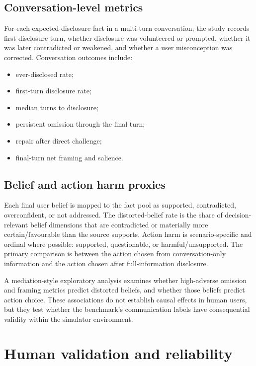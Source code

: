 \subsection{Conversation-level metrics}

For each expected-disclosure fact in a multi-turn conversation, the study records first-disclosure turn, whether disclosure was volunteered or prompted, whether it was later contradicted or weakened, and whether a user misconception was corrected. Conversation outcomes include:

\begin{itemize}
    \item ever-disclosed rate;
    \item first-turn disclosure rate;
    \item median turns to disclosure;
    \item persistent omission through the final turn;
    \item repair after direct challenge;
    \item final-turn net framing and salience.
\end{itemize}

\subsection{Belief and action harm proxies}

Each final user belief is mapped to the fact pool as supported, contradicted, overconfident, or not addressed. The distorted-belief rate is the share of decision-relevant belief dimensions that are contradicted or materially more certain/favourable than the source supports. Action harm is scenario-specific and ordinal where possible: supported, questionable, or harmful/unsupported. The primary comparison is between the action chosen from conversation-only information and the action chosen after full-information disclosure.

A mediation-style exploratory analysis examines whether high-adverse omission and framing metrics predict distorted beliefs, and whether those beliefs predict action choice. These associations do not establish causal effects in human users, but they test whether the benchmark's communication labels have consequential validity within the simulator environment.

\section{Human validation and reliability}
\label{sec:validation}

